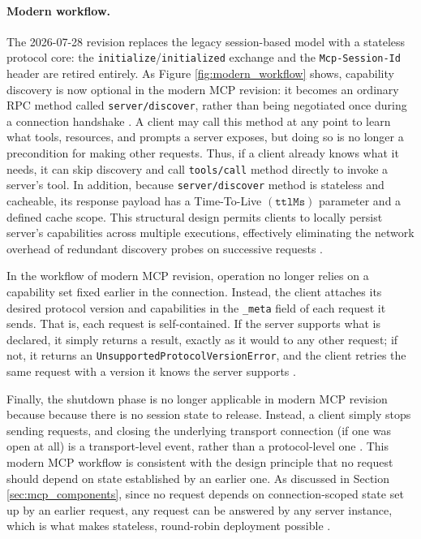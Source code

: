 \documentclass[english, 12pt, a4paper, elec, utf8, a-2b, online]{aaltothesis}
\begin{document}
\paragraph{Modern workflow.} The 2026-07-28 revision replaces the legacy session-based model with a stateless protocol core: the \texttt{initialize}/\texttt{initialized} exchange and the \texttt{Mcp-Session-Id} header are retired entirely.
As Figure \ref{fig:modern_workflow} shows, capability discovery is now optional in the modern MCP revision: it becomes an ordinary RPC method called \texttt{server/discover}, rather than being negotiated once during a connection handshake \cite{soriaparra2026spec}. 
A client may call this method at any point to learn what tools, resources, and prompts a server exposes, but doing so is no longer a precondition for making other requests.
Thus, if a client already knows what it needs, it can skip discovery and
call \texttt{tools/call} method directly to invoke a server's tool. 
In addition, because \texttt{server/discover} method is stateless and cacheable, its response payload has a Time-To-Live \((\texttt{ttlMs})\) parameter and a defined cache scope. %
This structural design permits clients to locally persist server's capabilities across multiple executions, effectively eliminating the network overhead of redundant discovery probes on successive requests \cite{soriaparra2026spec}.
  
In the workflow of modern MCP revision, operation no longer relies on a capability set fixed earlier in the connection. 
Instead, the client attaches its desired protocol version and capabilities in the \texttt{\_meta} field of each request it sends. 
That is, each request is self-contained. 
If the server supports what is declared, it simply returns a result, exactly
as it would to any other request; if not, it returns an \texttt{UnsupportedProtocolVersionError}, and the client retries the same request with a version it knows the server supports \cite{mcpversioning2026}. 

Finally, the shutdown phase is no longer applicable in modern MCP revision because because there is no session state to release.
Instead, a client simply stops sending requests, and closing the underlying transport connection (if one was open at all) is a transport-level event, rather than a protocol-level one \cite{mcpversioning2026}. %
This modern MCP workflow is consistent with the design principle that no request should depend on state established by an earlier one.
As discussed in Section \ref{sec:mcp_components}, since no request depends
on connection-scoped state set up by an earlier request, any request can be
answered by any server instance, which is what makes stateless, round-robin deployment possible \cite{mcpchangelog2026}.
\end{document}
